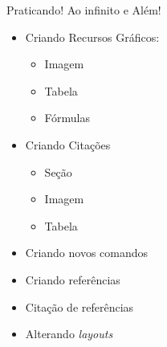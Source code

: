 \begin{frame}{Praticando! Ao infinito e Além!}
    \begin{itemize}
        \item Criando Recursos Gráficos:
        \begin{itemize}
            \item Imagem
            \item Tabela
            \item Fórmulas
        \end{itemize}
        \item Criando Citações
        \begin{itemize}
            \item Seção
            \item Imagem
            \item Tabela
        \end{itemize}
        \item Criando novos comandos
        \item Criando referências 
        \item Citação de referências
        \item Alterando \textit{layouts}
        
    \end{itemize}
\end{frame} 
